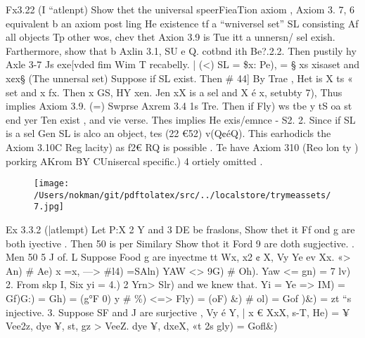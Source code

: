 \documentclass[a4paper,12pt]{article}
\begin{document}
\vspace{10pt}

\par

\vspace{10pt}

    Fx3.22 (I “atlenpt)  Show thet the universal speerFieaTion axiom , Axiom 3. 7, 6 equivalent b  an axiom post ling He existence tf a “wniversel set” SL consisting Af all objects    Tp other wos, chev thet Axion 3.9 is Tue itt a unnersn/ sel exish.    Farthermore, show that b Axlin 3.1, SU e Q. cotbnd ith Be?.2.2.  Then pustily hy Axle 3-7 Js exe[vded fim Wim T recabelly.    | (<) SL = \$x: Pe), = § xs xisaset and x¢x§ (The unnersal set)    Suppose if SL exist. Then \# 44] By Trae , Het is X ts « set and x fx.  Then x GS,    HY xen.  Jen xX is a sel and X é x, setubty 7),  Thus implies Axiom 3.9.    (=) Swprse Axrem 3.4 1s Tre. Then if Fly) ws tbe y tS oa st end yer  Ten exist , and vie verse.  Thes implies He exis/emnce - S2.    2. Since if SL is a sel Gen SL is alco an object, tes (22 €52) v(Q¢éQ).  This earhodicls the Axiom 3.10C Reg lacity) as f2€ RQ is possible .    Te have Axiom 310 (Reo lon ty ) porkirg AKrom BY CUnisercal specific.)  4 ortiely omitted . 

\vspace{10pt}

\par

\vspace{10pt}

\begin{figure}[h]

\texttt{[image: /Users/nokman/git/pdftolatex/src/../localstore/trymeassets/7.jpg]}

\centering

\end{figure}

\par

\vspace{10pt}

    Ex 3.3.2 (|atlempt)  Let P:X 2 Y and 3 DE be fraslons,  Show thet it Ff ond g are both iyective . Then 50 is per    Similary Show thot it Ford 9 are doth sugjective. . Men 50 5 J of.    L Suppose Food g are inyectme tt Wx, x2 ¢ X, Vy Ye ev    Xx. «> An) \# Ae) x =x, —> \#l4) =SAln)  YAW <> 9G) \# Oh). Yaw <= gn) = 7 lv)    2. From skp I, Six yi = 4.) 2 Yrn> Slr)  and we knew that. Yi = Ye => IM) = Gf)G:) = Gh) = (g°F 0)  y \# \%) <=> Fly) = (oF) \&) \# ol) = Gof )\&)  = zt “s injective.    3. Suppose SF and J are surjective , Vy é Y, | x € XxX, s-T, He) = ¥  Vee2z, dye ¥, st, gz    > VeeZ. dye ¥, dxeX, «t 2s gly) = Gofl\&) 
\end{document}
